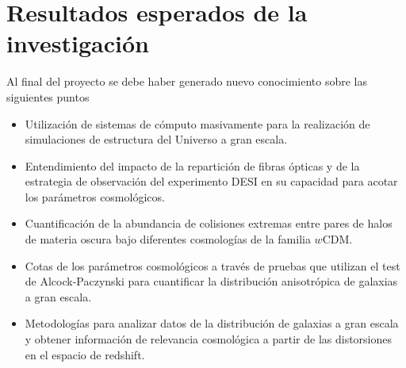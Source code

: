 
\section{Resultados esperados de la investigaci\'on}

Al final del proyecto se debe haber generado nuevo conocimiento sobre las siguientes puntos 
 
\begin{itemize}
\item Utilizaci\'on de sistemas de c\'omputo masivamente para la
  realizaci\'on de simulaciones de estructura del Universo a gran
  escala.
\item Entendimiento del impacto de la repartici\'on de fibras
  \'opticas y de la estrategia de observaci\'on del experimento DESI
en su capacidad para acotar los par\'ametros cosmol\'ogicos.
\item Cuantificaci\'on de la abundancia de colisiones extremas entre
  pares de halos de materia oscura bajo diferentes cosmolog\'ias de la
  familia $w$CDM.
\item Cotas de los par\'ametros cosmol\'ogicos a trav\'es de pruebas
  que utilizan el test de Alcock-Paczynski para cuantificar la
  distribuci\'on anisotr\'opica de galaxias a gran escala.
\item Metodolog\'ias para analizar datos de la distribuci\'on de
  galaxias a gran escala y obtener informaci\'on de relevancia
  cosmol\'ogica a partir de las distorsiones en el espacio de
  redshift.
\end{itemize}

